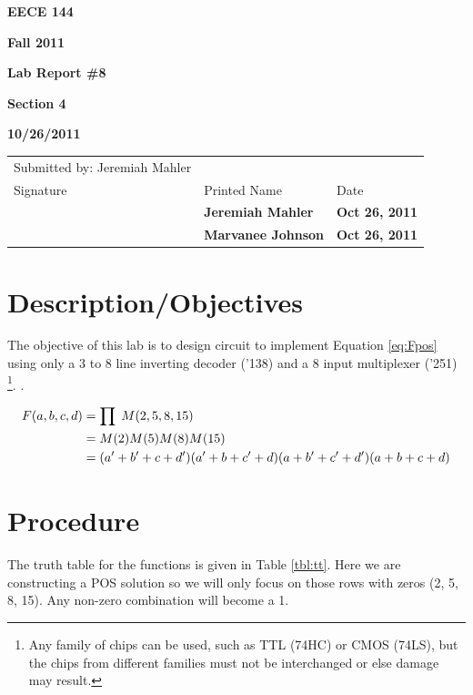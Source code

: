 \documentclass[12pt]{article}
\begin{document}
\centerline{\bf EECE 144}
\centerline{\bf Fall 2011}
\centerline{\bf}
\centerline{\bf Lab Report \#8}
\centerline{\bf Section 4}
\centerline{\bf 10/26/2011}
\begin{center}
\begin{tabularx}{\textwidth}[b]{X l l}
Submitted by: Jeremiah Mahler & & \\
Signature & Printed Name & Date \\
\hline
\multicolumn{1}{|X|}{} & \multicolumn{1}{|l|}{\bigstrut \bf Jeremiah Mahler} & \multicolumn{1}{|l|}{\bf Oct 26, 2011} \\
\hline
\multicolumn{1}{|X|}{} & \multicolumn{1}{|l|}{\bigstrut \bf Marvanee Johnson} & \multicolumn{1}{|l|}{\bf Oct 26, 2011} \\
\hline
\end{tabularx}
\end{center}

\section{Description/Objectives}

The objective of this lab is to design circuit to implement
Equation \ref{eq:Fpos} using only a 3 to 8 line inverting
decoder ('138) and a 8 input multiplexer ('251)
\footnote{Any family of chips can be used, such as TTL (74HC) or CMOS (74LS),
but the chips from different families must not be interchanged or else
damage may result.}.
.

\begin{align}
F(a,b,c,d) 	&= \prod \; M(2,5,8,15) \label{eq:Fpos} \\
			&= M(2) M(5) M(8) M(15) \notag \\	
			&= (a' + b' + c + d')(a' + b + c' + d)(a + b' + c' + d')
				(a + b + c + d) \notag
\end{align}


\section{Procedure}
\label{sec:procedure}

The truth table for the functions is given in Table \ref{tbl:tt}.
Here we are constructing a POS solution so we will only focus
on those rows with zeros (2, 5, 8, 15).
Any non-zero combination will become a 1.
\end{document}
